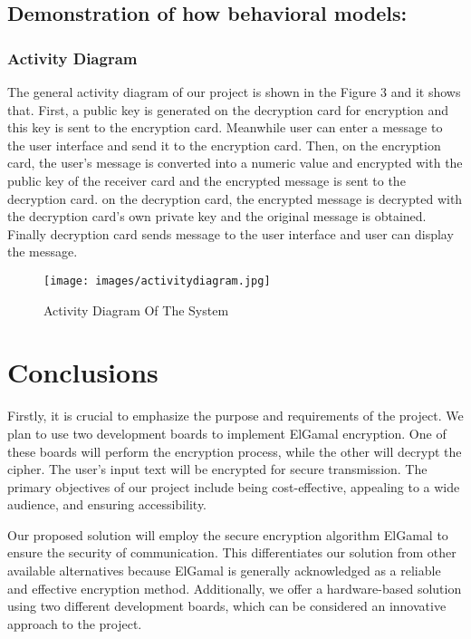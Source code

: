 \documentclass[12pt]{article}
\begin{document}
\vskip 10cm
\subsection{Demonstration of how behavioral models:}
	
	\subsubsection{Activity Diagram}
 The general activity diagram of our project is shown in the Figure 3 and it shows that. First, a public key is generated on the decryption card for encryption and this key is sent to the encryption card. Meanwhile user can enter a message to the user interface and send it to the encryption card. Then, on the encryption card, the user's message is converted into a numeric value and encrypted with the public key of the receiver card and the encrypted message is sent to the decryption card. on the decryption card, the encrypted message is decrypted with the decryption card's own private key and the original message is obtained. Finally decryption card sends message to the user interface and user can display the message.
 	\begin{figure}[H]
 		\centering
 		\label{Uml Diagram Of The System}
 		\texttt{[image: images/activitydiagram.jpg]}\\[0.5 cm]	
 		\caption{Activity Diagram Of The System} 		
 	\end{figure}
 	\newpage
	\section{Conclusions}
	
	Firstly, it is crucial to emphasize the purpose and requirements of the project. We plan to use two development boards to implement ElGamal encryption. One of these boards will perform the encryption process, while the other will decrypt the cipher. The user's input text will be encrypted for secure transmission. The primary objectives of our project include being cost-effective, appealing to a wide audience, and ensuring accessibility.\cite{koblitz2012course}

	
	Our proposed solution will employ the secure encryption algorithm ElGamal to ensure the security of communication. This differentiates our solution from other available alternatives because ElGamal is generally acknowledged as a reliable and effective encryption method\cite{mollin2001introduction}. Additionally, we offer a hardware-based solution using two different development boards, which can be considered an innovative approach to the project.
	
\end{document}
